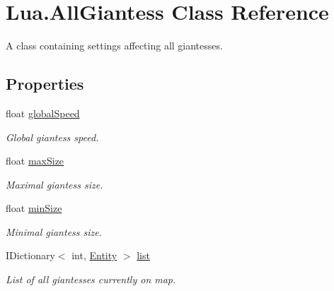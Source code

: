 \hypertarget{class_lua_1_1_all_giantess}{}\section{Lua.\+All\+Giantess Class Reference}
\label{class_lua_1_1_all_giantess}


A class containing settings affecting all giantesses.  


\subsection*{Properties}
\begin{DoxyCompactItemize}
\item 
float \mbox{\hyperlink{class_lua_1_1_all_giantess_a76e7e6cca768273ffd53a6b8a3127ffe}{global\+Speed}}
\begin{DoxyCompactList}\small\item\em Global giantess speed. \end{DoxyCompactList}\item 
float \mbox{\hyperlink{class_lua_1_1_all_giantess_af82af573b560f17c3b0cd575bd61ed00}{max\+Size}}
\begin{DoxyCompactList}\small\item\em Maximal giantess size. \end{DoxyCompactList}\item 
float \mbox{\hyperlink{class_lua_1_1_all_giantess_a4852dd60230117796328807f41509dbf}{min\+Size}}
\begin{DoxyCompactList}\small\item\em Minimal giantess size. \end{DoxyCompactList}\item 
I\+Dictionary$<$ int, \mbox{\hyperlink{class_lua_1_1_entity}{Entity}} $>$ \mbox{\hyperlink{class_lua_1_1_all_giantess_adc5824c47c4090e1d8769ddde5c9da6a}{list}}
\begin{DoxyCompactList}\small\item\em List of all giantesses currently on map. \end{DoxyCompactList}\end{DoxyCompactItemize}


